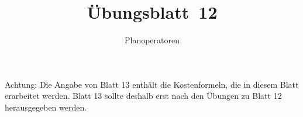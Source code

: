 
\title{Übungsblatt~12}
\subtitle{Planoperatoren}
\maketitle

\begin{note}
	Achtung: Die Angabe von Blatt 13 enthält die Kostenformeln, die in diesem Blatt erarbeitet werden.
	Blatt 13 sollte deshalb erst nach den Übungen zu Blatt 12 herausgegeben werden.
\end{note}





\beamertxt{\pagebreak}


\beamertxt{\pagebreak}


\beamertxt{\pagebreak}


\begin{deeper}

\end{deeper}


